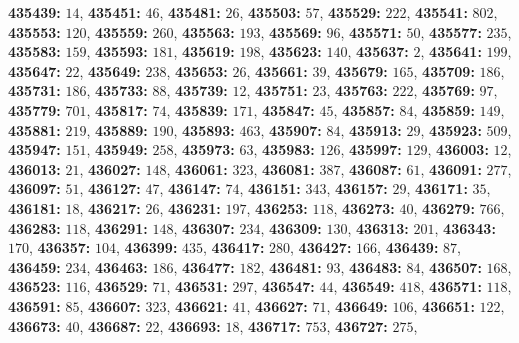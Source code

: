 \textsf{\bfseries 435439:} $14$, \textsf{\bfseries 435451:} $46$, \textsf{\bfseries 435481:} $26$, \textsf{\bfseries 435503:} $57$, \textsf{\bfseries 435529:} $222$, \textsf{\bfseries 435541:} $802$, \textsf{\bfseries 435553:} $120$, \textsf{\bfseries 435559:} $260$, \textsf{\bfseries 435563:} $193$, \textsf{\bfseries 435569:} $96$, \textsf{\bfseries 435571:} $50$, \textsf{\bfseries 435577:} $235$, \textsf{\bfseries 435583:} $159$, \textsf{\bfseries 435593:} $181$, \textsf{\bfseries 435619:} $198$, \textsf{\bfseries 435623:} $140$, \textsf{\bfseries 435637:} $2$, \textsf{\bfseries 435641:} $199$, \textsf{\bfseries 435647:} $22$, \textsf{\bfseries 435649:} $238$, \textsf{\bfseries 435653:} $26$, \textsf{\bfseries 435661:} $39$, \textsf{\bfseries 435679:} $165$, \textsf{\bfseries 435709:} $186$, \textsf{\bfseries 435731:} $186$, \textsf{\bfseries 435733:} $88$, \textsf{\bfseries 435739:} $12$, \textsf{\bfseries 435751:} $23$, \textsf{\bfseries 435763:} $222$, \textsf{\bfseries 435769:} $97$, \textsf{\bfseries 435779:} $701$, \textsf{\bfseries 435817:} $74$, \textsf{\bfseries 435839:} $171$, \textsf{\bfseries 435847:} $45$, \textsf{\bfseries 435857:} $84$, \textsf{\bfseries 435859:} $149$, \textsf{\bfseries 435881:} $219$, \textsf{\bfseries 435889:} $190$, \textsf{\bfseries 435893:} $463$, \textsf{\bfseries 435907:} $84$, \textsf{\bfseries 435913:} $29$, \textsf{\bfseries 435923:} $509$, \textsf{\bfseries 435947:} $151$, \textsf{\bfseries 435949:} $258$, \textsf{\bfseries 435973:} $63$, \textsf{\bfseries 435983:} $126$, \textsf{\bfseries 435997:} $129$, \textsf{\bfseries 436003:} $12$, \textsf{\bfseries 436013:} $21$, \textsf{\bfseries 436027:} $148$, \textsf{\bfseries 436061:} $323$, \textsf{\bfseries 436081:} $387$, \textsf{\bfseries 436087:} $61$, \textsf{\bfseries 436091:} $277$, \textsf{\bfseries 436097:} $51$, \textsf{\bfseries 436127:} $47$, \textsf{\bfseries 436147:} $74$, \textsf{\bfseries 436151:} $343$, \textsf{\bfseries 436157:} $29$, \textsf{\bfseries 436171:} $35$, \textsf{\bfseries 436181:} $18$, \textsf{\bfseries 436217:} $26$, \textsf{\bfseries 436231:} $197$, \textsf{\bfseries 436253:} $118$, \textsf{\bfseries 436273:} $40$, \textsf{\bfseries 436279:} $766$, \textsf{\bfseries 436283:} $118$, \textsf{\bfseries 436291:} $148$, \textsf{\bfseries 436307:} $234$, \textsf{\bfseries 436309:} $130$, \textsf{\bfseries 436313:} $201$, \textsf{\bfseries 436343:} $170$, \textsf{\bfseries 436357:} $104$, \textsf{\bfseries 436399:} $435$, \textsf{\bfseries 436417:} $280$, \textsf{\bfseries 436427:} $166$, \textsf{\bfseries 436439:} $87$, \textsf{\bfseries 436459:} $234$, \textsf{\bfseries 436463:} $186$, \textsf{\bfseries 436477:} $182$, \textsf{\bfseries 436481:} $93$, \textsf{\bfseries 436483:} $84$, \textsf{\bfseries 436507:} $168$, \textsf{\bfseries 436523:} $116$, \textsf{\bfseries 436529:} $71$, \textsf{\bfseries 436531:} $297$, \textsf{\bfseries 436547:} $44$, \textsf{\bfseries 436549:} $418$, \textsf{\bfseries 436571:} $118$, \textsf{\bfseries 436591:} $85$, \textsf{\bfseries 436607:} $323$, \textsf{\bfseries 436621:} $41$, \textsf{\bfseries 436627:} $71$, \textsf{\bfseries 436649:} $106$, \textsf{\bfseries 436651:} $122$, \textsf{\bfseries 436673:} $40$, \textsf{\bfseries 436687:} $22$, \textsf{\bfseries 436693:} $18$, \textsf{\bfseries 436717:} $753$, \textsf{\bfseries 436727:} $275$, 
